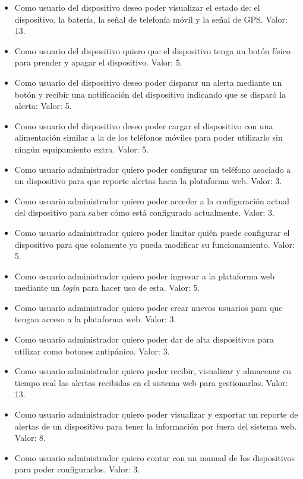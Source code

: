 \documentclass[
11pt, %
]{charter}
\begin{document}
\begin{itemize}
	\item Como usuario del dispositivo deseo poder visualizar el estado de: el dispositivo, la batería, la señal de telefonía móvil y la señal de GPS. Valor: 13.
	\item Como usuario del dispositivo quiero que el dispositivo tenga un botón físico para prender y apagar el dispositivo. Valor: 5.
	\item Como usuario del dispositivo deseo poder disparar un alerta mediante un botón y recibir una notificación del dispositivo indicando que se disparó la alerta: Valor: 5.
	\item Como usuario del dispositivo deseo poder cargar el dispositivo con una alimentación similar a la de los teléfonos móviles para poder utilizarlo sin ningún equipamiento extra. Valor: 5.
	\item Como usuario administrador quiero poder configurar un teléfono asociado a un dispositivo para que reporte alertas hacia la plataforma web. Valor: 3.
	\item Como usuario administrador quiero poder acceder a la configuración actual del dispositivo para saber cómo está configurado actualmente. Valor: 3.
	\item Como usuario administrador quiero poder limitar quién puede configurar el dispositivo para que solamente yo pueda modificar su funcionamiento. Valor: 5.
	\item Como usuario administrador quiero poder ingresar a la plataforma web mediante un \textit{login} para hacer uso de esta. Valor: 5.
	\item Como usuario administrador quiero poder crear nuevos usuarios para que tengan acceso a la plataforma web. Valor: 3.
	\item Como usuario administrador quiero poder dar de alta dispositivos para utilizar como botones antipánico. Valor: 3.
	\item Como usuario administrador quiero poder recibir, visualizar y almacenar en tiempo real las alertas recibidas en el sistema web para gestionarlas. Valor: 13.
	\item Como usuario administrador quiero poder visualizar y exportar un reporte de alertas de un dispositivo para tener la información por fuera del sistema web. Valor: 8.
	\item Como usuario administrador quiero contar con un manual de los dispositivos para poder configurarlos. Valor: 3.

\end{itemize}
\end{document}
